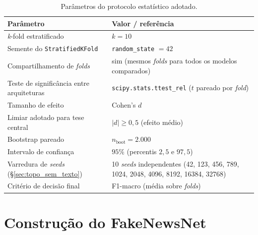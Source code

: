 \begin{table}[H]\centering
\caption{Par\^ametros do protocolo estat\'istico adotado.}
\label{tab:hp_protocolo}
\small
\begin{tabular}{lp{8.5cm}}
\toprule
\textbf{Par\^ametro} & \textbf{Valor / refer\^encia} \\
\midrule
\emph{k}-fold estratificado                & $k = 10$ \cite{kohavi1995cv} \\
Semente do \texttt{StratifiedKFold}        & \texttt{random\_state} $= 42$ \\
Compartilhamento de \emph{folds}           & sim (mesmos \emph{folds} para todos os modelos comparados) \\
Teste de signific\^ancia entre arquiteturas & \texttt{scipy.stats.ttest\_rel} ($t$ pareado por \emph{fold}) \\
Tamanho de efeito                          & Cohen's $d$ \cite{cohen1988statistical, sawilowsky2009effect} \\
\quad Limiar adotado para tese central     & $|d| \geq 0{,}5$ (efeito m\'edio) \\
Bootstrap pareado                           & $n_{\mathrm{boot}} = 2.000$ \cite{efron1993bootstrap} \\
\quad Intervalo de confian\c{c}a            & $95\%$ (percentis $2{,}5$ e $97{,}5$) \\
Varredura de \emph{seeds} (\S\ref{sec:topo_sem_texto}) & 10 \emph{seeds} independentes (42, 123, 456, 789, 1024, 2048, 4096, 8192, 16384, 32768) \\
Crit\'erio de decis\~ao final              & F1-macro (m\'edia sobre \emph{folds}) \\
\bottomrule
\end{tabular}
\end{table}

\section{Constru\c{c}\~ao do FakeNewsNet}
\label{sec:hp_fnn}

